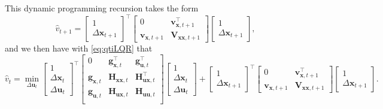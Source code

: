 \documentclass[10pt,a4paper]{article} %
\newcommand{\trsp}{{\scriptscriptstyle\top}}
\begin{document}
This dynamic programming recursion takes the form 
\begin{equation}
	\hat{v}_{t+1} =
	\begin{bmatrix}
	1 \\ \Delta\bm{x}_{t+1}
	\end{bmatrix}^{\!\trsp}
	\begin{bmatrix}
	0 & \bm{v}_{\bm{x},{t+1}}^\trsp \\
	\bm{v}_{\bm{x},{t+1}} & \bm{V}_{\bm{x}\bm{x},{t+1}} 
	\end{bmatrix}
	\begin{bmatrix}
	1 \\ \Delta\bm{x}_{t+1}
	\end{bmatrix},
	\label{eq:vhatTiLQR}
\end{equation}
and we then have with \eqref{eq:qtiLQR} that
\begin{equation}
	\hat{v}_{t} = \min_{\Delta\bm{u}_{t}} 
	\begin{bmatrix}
	1 \\ \Delta\bm{x}_{t} \\ \Delta\bm{u}_{t}
	\end{bmatrix}^{\!\trsp}
	\begin{bmatrix}
	0 & \bm{g}_{\bm{x},{t}}^\trsp & \bm{g}_{\bm{u},{t}}^\trsp \\
	\bm{g}_{\bm{x},{t}} & \bm{H}_{\bm{x}\bm{x},{t}} & \bm{H}_{\bm{u}\bm{x},{t}}^\trsp \\
	\bm{g}_{\bm{u},{t}} & \bm{H}_{\bm{u}\bm{x},{t}} & \bm{H}_{\bm{u}\bm{u},{t}} \\
	\end{bmatrix}
	\begin{bmatrix}
	1 \\ \Delta\bm{x}_{t} \\ \Delta\bm{u}_{t}
	\end{bmatrix}
	+ 
	\begin{bmatrix}
	1 \\ \Delta\bm{x}_{t+1}
	\end{bmatrix}^{\!\trsp}
	\begin{bmatrix}
	0 & \bm{v}_{\bm{x},{t+1}}^\trsp \\
	\bm{v}_{\bm{x},{t+1}} & \bm{V}_{\bm{x}\bm{x},{t+1}} 
	\end{bmatrix}
	\begin{bmatrix}
	1 \\ \Delta\bm{x}_{t+1}
	\end{bmatrix}.
	\label{eq:ct0iLQR}
\end{equation}
\end{document}
